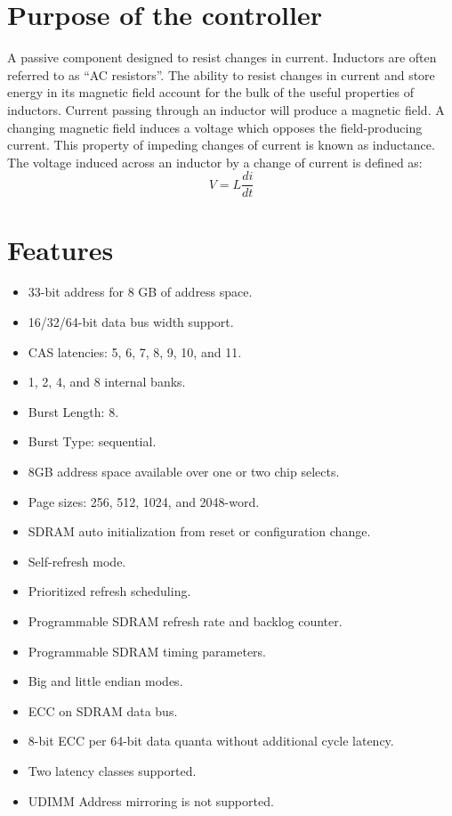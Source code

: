 \section{Purpose of the controller}

\hspace{10mm}A passive component designed to resist changes in current. Inductors are often referred to as “AC resistors”. The ability
to resist changes in current and store energy in its magnetic field account for the bulk of the useful properties of inductors. Current passing through an inductor will produce a magnetic field. A changing magnetic field induces a voltage which opposes the field-producing current. This property of impeding changes of current is known as inductance. The voltage induced across an inductor by a change of current is defined as:
$$V = L \frac{di}{dt}$$



\section{Features}




\begin{itemize}
    \item 33-bit address for 8 GB of address space.
    \item 16/32/64-bit data bus width support.
    \item CAS latencies: 5, 6, 7, 8, 9, 10, and 11.
    \item 1, 2, 4, and 8 internal banks.
    \item Burst Length: 8.
    \item Burst Type: sequential.
    \item 8GB address space available over one or two chip selects.
    \item Page sizes: 256, 512, 1024, and 2048-word.
    \item SDRAM auto initialization from reset or configuration change.
    \item Self-refresh mode.
    \item Prioritized refresh scheduling.
    \item Programmable SDRAM refresh rate and backlog counter.
    \item Programmable SDRAM timing parameters.
    \item Big and little endian modes.
    \item ECC on SDRAM data bus.
    \item 8-bit ECC per 64-bit data quanta without additional cycle latency.
    \item Two latency classes supported.
    \item UDIMM Address mirroring is not supported.
\end{itemize}
 

